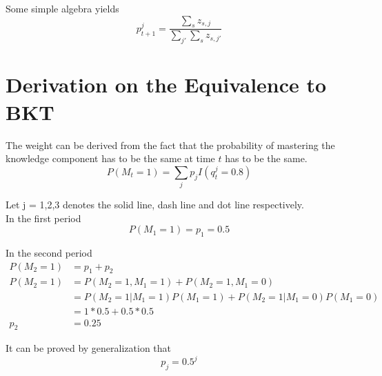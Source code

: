 \documentclass{article}
\begin{document}
Some simple algebra yields
\[
p^j_{t+1} = \frac{\sum_{s} z_{s,j}}{\sum_{j'}\sum_{s} z_{s,j'}}
\]

\section{Derivation on the Equivalence to BKT}
The weight can be derived from the fact that the probability of mastering the knowledge component has to be the same at time $t$ has to be the same.
\[
P(M_t=1) = \sum_j p_jI(q_t^j=0.8)
\]

Let j = 1,2,3 denotes the solid line, dash line and dot line respectively.\\

In the first period
\[P(M_1=1)=p_1 = 0.5\]

In the second period
\begin{align*}
P(M_2=1) &=p_1+p_2\\
P(M_2=1) &= P(M_2=1,M_1=1)+P(M_2=1,M_1=0)\\ 
		 &= P(M_2=1|M_1=1)P(M_1=1)+P(M_2=1|M_1=0)P(M_1=0)\\
		 & = 1*0.5+0.5*0.5\\ 
p_2 &= 0.25
\end{align*}

It can be proved by generalization that 
\[
p_j = 0.5^j
\]
\end{document}
